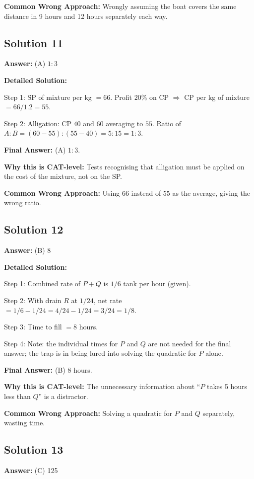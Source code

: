 \documentclass[11pt]{article}
\begin{document}
\textbf{Common Wrong Approach:} Wrongly assuming the boat covers the same distance in 9 hours and 12 hours separately each way.

\subsection*{Solution 11}
\textbf{Answer:} (A) $1:3$

\textbf{Detailed Solution:}

Step 1: SP of mixture per kg $= 66$. Profit $20\%$ on CP $\Rightarrow$ CP per kg of mixture $= 66/1.2 = 55$.

Step 2: Alligation: CP $40$ and $60$ averaging to $55$. Ratio of $A:B = (60 - 55):(55 - 40) = 5:15 = 1:3$.

\textbf{Final Answer:} (A) $1:3$.

\textbf{Why this is CAT-level:} Tests recognising that alligation must be applied on the cost of the mixture, not on the SP.

\textbf{Common Wrong Approach:} Using $66$ instead of $55$ as the average, giving the wrong ratio.

\subsection*{Solution 12}
\textbf{Answer:} (B) 8

\textbf{Detailed Solution:}

Step 1: Combined rate of $P + Q$ is $1/6$ tank per hour (given).

Step 2: With drain $R$ at $1/24$, net rate $= 1/6 - 1/24 = 4/24 - 1/24 = 3/24 = 1/8$.

Step 3: Time to fill $= 8$ hours.

Step 4: Note: the individual times for $P$ and $Q$ are not needed for the final answer; the trap is in being lured into solving the quadratic for $P$ alone.

\textbf{Final Answer:} (B) 8 hours.

\textbf{Why this is CAT-level:} The unnecessary information about ``$P$ takes 5 hours less than $Q$'' is a distractor.

\textbf{Common Wrong Approach:} Solving a quadratic for $P$ and $Q$ separately, wasting time.

\subsection*{Solution 13}
\textbf{Answer:} (C) 125
\end{document}

